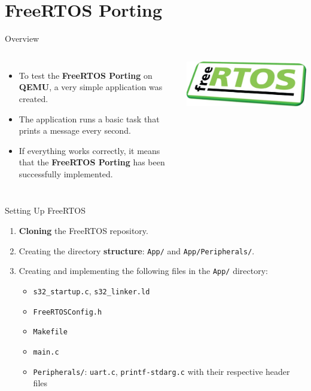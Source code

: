 
\section{FreeRTOS Porting}

\begin{frame}{Overview}
    \begin{columns}
        \begin{itemize}
            \item To test the \textbf{FreeRTOS Porting} on \textbf{QEMU}, a very simple application was created.
            \item The application runs a basic task that prints a message every second.
            \item If everything works correctly, it means that the \textbf{FreeRTOS Porting} has been successfully implemented.
        \end{itemize}
        \centering
        \includegraphics[width=0.9\linewidth]{../images/FreeRTOS_logo.png}
    \end{columns}
\end{frame}

\begin{frame}{Setting Up FreeRTOS}
    \begin{enumerate}
        \item \textbf{Cloning} the FreeRTOS repository.
        \item Creating the directory \textbf{structure}: \texttt{App/} and \texttt{App/Peripherals/}.
        \item Creating and implementing the following files in the \texttt{App/} directory:
            \begin{itemize}
                \item \texttt{s32\_startup.c}, \texttt{s32\_linker.ld}
                \item \texttt{FreeRTOSConfig.h}
                \item \texttt{Makefile}
                \item \texttt{main.c}
                \item \texttt{Peripherals/}: \texttt{uart.c}, \texttt{printf-stdarg.c} with their respective header files
            \end{itemize}
    \end{enumerate}
\end{frame}

